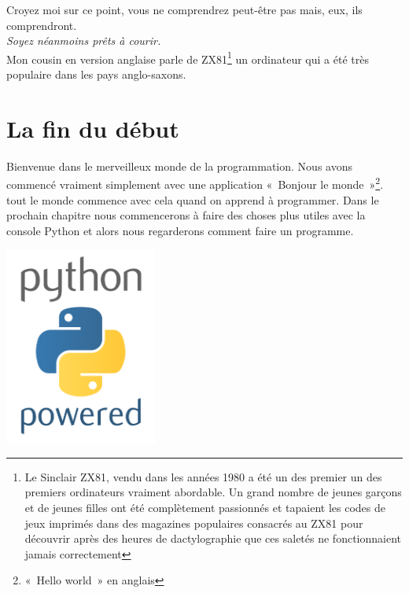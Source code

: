 Croyez moi sur ce point, vous ne comprendrez peut-être pas mais, eux, ils comprendront.\\

\emph{Soyez néanmoins prêts à courir.}\\


Mon cousin en version anglaise parle de ZX81\footnote{Le Sinclair ZX81, vendu dans les années 1980 a été un des premier un des premiers ordinateurs vraiment abordable. Un grand nombre de jeunes garçons et de jeunes filles ont été complètement passionnés et tapaient les codes de jeux imprimés dans des magazines populaires consacrés au ZX81 pour découvrir après des heures de dactylographie que ces saletés ne fonctionnaient jamais correctement} un ordinateur qui a été très populaire dans les pays anglo-saxons.


\section*{La fin du début}

Bienvenue dans le merveilleux monde de la programmation. Nous avons commencé vraiment simplement avec une 
application «~Bonjour le monde~»\footnote{«~Hello world~» en anglais}. tout le monde commence avec cela quand on apprend à programmer. Dans le prochain chapitre nous commencerons à faire des choses plus utiles avec la console Python et alors nous regarderons comment faire un programme.

 \vfill
\begin{center}
 \includegraphics[width=5cm]{images/python.pdf}
\end{center}
 \vfill

\newpage
\thispagestyle{empty}
